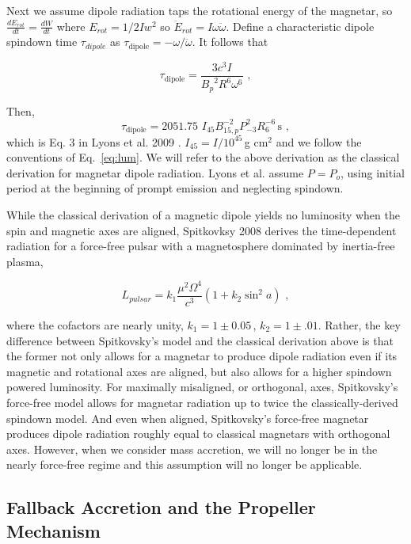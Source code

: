\documentclass{article}
\begin{document}
Next we assume dipole radiation taps the rotational energy of the magnetar, so $\frac{dE_{rot}}{dt} = \frac{dW}{dt}$ where $E_{rot} = 1/2 I w^2$ so $\ddot{E}_{rot} = I \omega \ddot{\omega}$. Define a characteristic dipole spindown time $\tau_{dipole}$ as $\tau_{\mathrm{dipole}} = - \omega/\ddot{\omega}$.
It follows that

\begin{equation}\tau_{\mathrm{dipole}} = \frac{3c^3 I}{{B_p}^2 R^6 \omega^6}\,\,,
\end{equation}

Then, \begin{equation}\tau_{\mathrm{dipole}} = 2051.75\,\, I_{45} B^{-2}_{15,p} P^2_{-3} R_6^{-6}\,\mathrm{s}\,\,,\end{equation}  which is Eq. 3 in Lyons et al. 2009 \cite{Lyons:2009ka}. $I_{45}=I/10^{45}$\,g cm$^2$ and we follow the conventions of Eq.~\ref{eq:lum}. We will refer to the above derivation as the classical derivation for magnetar dipole radiation.
Lyons et al. assume $P=P_o$, using initial period at the beginning of prompt emission and neglecting spindown.

While the classical derivation of a magnetic dipole yields no luminosity when the spin and magnetic axes are aligned, Spitkovksy 2008 \cite{Spitkovsky:2006np} derives the time-dependent radiation for a force-free pulsar with a magnetosphere dominated by inertia-free plasma,

\begin{equation}
L_{pulsar}=k_1 \frac{\mu^2 \Omega^4}{c^3}(1+k_2 \sin^2{a})\,\,,
\end{equation}

where the cofactors are nearly unity, $k_1=1\pm 0.05$\,, $k_2=1\pm .01$. Rather, the key difference between Spitkovsky's model and the classical derivation above is that the former not only allows for a magnetar to produce dipole radiation even if its magnetic and rotational axes are aligned, but also allows for a higher spindown powered luminosity. For maximally misaligned, or orthogonal, axes, Spitkovsky's force-free model allows for magnetar radiation up to twice the classically-derived spindown model. And even when aligned, Spitkovsky's force-free magnetar produces dipole radiation roughly equal to classical magnetars with orthogonal axes.  However, when we consider mass accretion, we will no longer be in the nearly force-free regime and this assumption will no longer be applicable.

\subsection{Fallback Accretion and the Propeller Mechanism} \label{sec:fallback}
\end{document}

